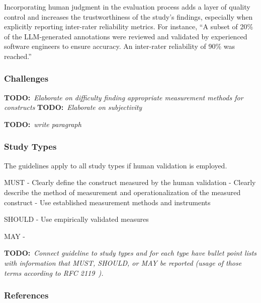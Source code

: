 \documentclass[11pt]{article}
\newcommand{\todo}[1]{{\textbf{TODO:}\ \textit{#1}}} %
\begin{document}
Incorporating human judgment in the evaluation process adds a layer of quality control and increases the trustworthiness of the study’s findings, especially when explicitly reporting inter-rater reliability metrics. For instance, ``A subset of 20\% of the LLM-generated annotations were reviewed and validated by experienced software engineers to ensure accuracy. An inter-rater reliability of 90\% was reached.''


\subsubsection{Challenges}

\todo{Elaborate on difficulty finding appropriate measurement methods for constructs}
\todo{Elaborate on subjectivity}

\todo{write paragraph}


\subsubsection{Study Types}

The guidelines apply to all study types if human validation is employed.

MUST
- Clearly define the construct measured by the human validation
- Clearly describe the method of measurement and operationalization of the measured construct
- Use established measurement methods and instruments

SHOULD
- Use empirically validated measures

MAY
- 

\todo{Connect guideline to study types and for each type have bullet point lists with information that MUST, SHOULD, or MAY be reported (usage of those terms according to RFC 2119~\cite{rfc2119}).}


\subsubsection{References}



\end{document}
